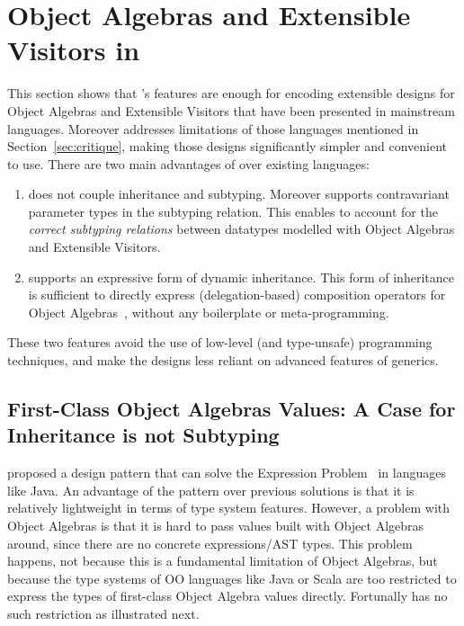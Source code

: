 \section{Object Algebras and Extensible Visitors in \name}
\label{sec:OA}

This section shows that \name's features are enough for encoding extensible
designs for Object Algebras and Extensible Visitors that have been presented in
mainstream languages. Moreover \name addresses limitations of those languages
mentioned in Section~\ref{sec:critique}, making those designs significantly
simpler and convenient to use. There are two main advantages of \name over
existing languages:
\begin{enumerate}
\item \name does not couple inheritance and subtyping. Moreover
\name supports contravariant parameter types in the subtyping
relation. This enables \name to account for the \emph{correct
subtyping relations} between datatypes modelled with Object Algebras 
and Extensible Visitors.
\item \name supports an expressive form of dynamic inheritance. This form
  of inheritance is sufficient to directly express (delegation-based) composition
  operators for Object Algebras~\cite{oliveira2012extensibility}, without any boilerplate or meta-programming.
\end{enumerate}

These two features avoid the use of low-level (and type-unsafe) programming
techniques, and make the designs less reliant on advanced
features of generics.


\subsection{First-Class Object Algebras Values: A Case for Inheritance
is not Subtyping}
\label{sec:objectalgebra}

\citet{oliveira2012extensibility} proposed a design pattern that can solve the
Expression Problem~\cite{wadler1998expression} in languages like Java. An
advantage of the pattern over previous solutions is that it is relatively
lightweight in terms of type system features. However, a problem with Object
Algebras is that it is hard to pass values built with Object Algebras around,
since there are no concrete expressions/AST types. This problem happens, not
because this is a fundamental limitation of Object Algebras, but because the
type systems of OO languages like Java or Scala are too restricted to express
the types of first-class Object Algebra values directly. Fortunally \name has no
such restriction as illustrated next.

